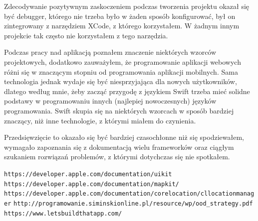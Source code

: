 \documentclass[a4paper,11pt,titlepage]{article}
\begin{document}
Zdecodywanie pozytywnym zaskoczeniem podczas tworzenia projektu okazał się być debugger, którego nie trzeba było w żaden sposób konfigurować, był on zintegrowany z narzędziem XCode, z którego korzystałem. W żadnym innym projekcie tak często nie korzystałem z tego narzędzia.


Podczas pracy nad aplikacją poznałem znaczenie niektórych wzorców projektowych, dodatkowo zauważyłem, że programowanie aplikacji webowych różni się w znaczącym stopniu od programowania aplikacji mobilnych. Sama technologia jednak wydaje się być niesprzyjająca dla nowych użytkowników, dlatego według mnie, żeby zacząć przygodę z językiem Swift trzeba mieć solidne podstawy w programowaniu innych (najlepiej nowoczesnych) języków programowania. Swift skupia się na niektórych wzorcach w sposób bardziej znaczący, niż inne technologie, z którymi miałem do czynienia.

Przedsięwzięcie to okazało się być bardziej czasochłonne niż się spodziewałem, wymagało zapoznania się z dokumentacją wielu frameworków oraz ciągłym szukaniem rozwiązań problemów, z którymi dotychczas się nie spotkałem.


\newpage
{}
\listoffigures
\newpage

\begin{thebibliography}{9}
\verb|https://developer.apple.com/documentation/uikit|
\verb|https://developer.apple.com/documentation/mapkit/|
\verb|https://developer.apple.com/documentation/corelocation/cllocationmanager|
\verb|http://programowanie.siminskionline.pl/resource/wp/ood_strategy.pdf|
\verb|https://www.letsbuildthatapp.com/|



\end{thebibliography}
\end{document}
